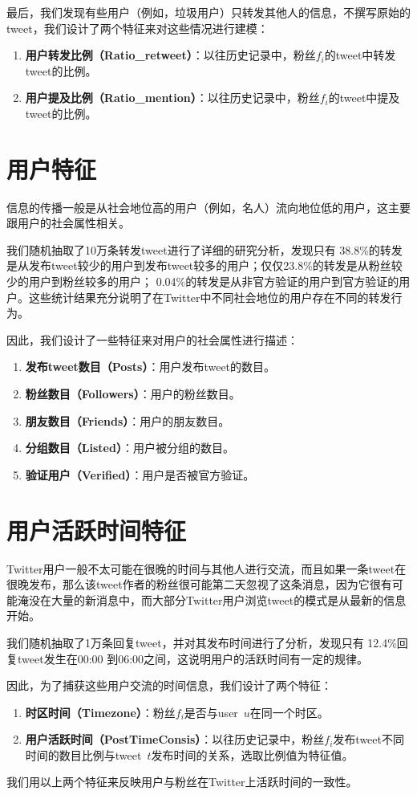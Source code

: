 最后，我们发现有些用户（例如，垃圾用户）只转发其他人的信息，不撰写原始的tweet，我们设计了两个特征来对这些情况进行建模：
  \begin{enumerate}
\item{\textbf{用户转发比例（Ratio\_retweet）}}：以往历史记录中，粉丝$f_i$的tweet中转发tweet的比例。
\item{\textbf{用户提及比例（Ratio\_mention）}}：以往历史记录中，粉丝$f_i$的tweet中提及tweet的比例。
\end{enumerate}

\section{用户特征}
信息的传播一般是从社会地位高的用户（例如，名人）流向地位低的用户，这主要跟用户的社会属性相关。

我们随机抽取了10万条转发tweet进行了详细的研究分析，发现只有 38.8\%的转发是从发布tweet较少的用户到发布tweet较多的用户；仅仅23.8\%的转发是从粉丝较少的用户到粉丝较多的用户；
0.04\%的转发是从非官方验证的用户到官方验证的用户。这些统计结果充分说明了在Twitter中不同社会地位的用户存在不同的转发行为。

因此，我们设计了一些特征来对用户的社会属性进行描述：
\begin{enumerate}
\item{\textbf{发布tweet数目（Posts）}}：用户发布tweet的数目。
\item{\textbf{粉丝数目（Followers）}}：用户的粉丝数目。
\item{\textbf{朋友数目（Friends）}}：用户的朋友数目。
\item{\textbf{分组数目（Listed）}}：用户被分组的数目。
\item{\textbf{验证用户（Verified）}}：用户是否被官方验证。
\end{enumerate}

\section{用户活跃时间特征}
Twitter用户一般不太可能在很晚的时间与其他人进行交流，而且如果一条tweet在很晚发布，那么该tweet作者的粉丝很可能第二天忽视了这条消息，因为它很有可能淹没在大量的新消息中，而大部分Twitter用户浏览tweet的模式是从最新的信息开始。

我们随机抽取了1万条回复tweet，并对其发布时间进行了分析，发现只有 12.4\%回复tweet发生在00:00 到06:00之间，这说明用户的活跃时间有一定的规律。

因此，为了捕获这些用户交流的时间信息，我们设计了两个特征：
\begin{enumerate}
\item{\textbf{时区时间（Timezone）}}：粉丝$f_i$是否与user~$u$在同一个时区。
\item{\textbf{用户活跃时间（PostTimeConsis）}}：以往历史记录中，粉丝$f_i$发布tweet不同时间的数目比例与tweet~$t$发布时间的关系，选取比例值为特征值。
\end{enumerate}
我们用以上两个特征来反映用户与粉丝在Twitter上活跃时间的一致性。

